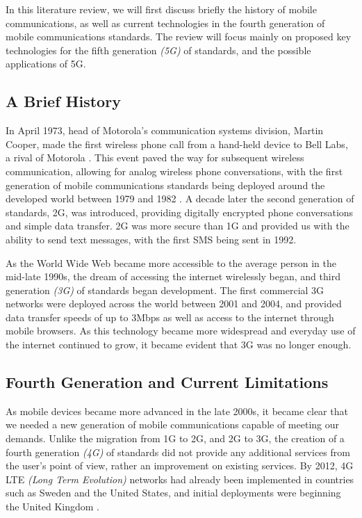 \documentclass[journal]{IEEEtran}
\begin{document}
In this literature review, we will first discuss briefly the history of mobile communications, as well as current technologies in the fourth generation of mobile communications standards. The review will focus mainly on proposed key technologies for the fifth generation \textit{(5G)} of standards, and the possible applications of 5G.

\subsection{A Brief History}
In April 1973, head of Motorola's communication systems division, Martin Cooper, made the first wireless phone call from a hand-held device to Bell Labs, a rival of Motorola \cite{tomfarhist}. This event paved the way for subsequent wireless communication, allowing for analog wireless phone conversations, with the first generation of mobile communications standards being deployed around the developed world between 1979 and 1982 \cite{evolution}. A decade later the second generation of standards, 2G, was introduced, providing digitally encrypted phone conversations and simple data transfer. 2G was more secure than 1G and provided us with the ability to send text messages, with the first SMS being sent in 1992. 

As the World Wide Web became more accessible to the average person in the mid-late 1990s, the dream of accessing the internet wirelessly began, and third generation \textit{(3G)} of standards began development. The first commercial 3G networks were deployed across the world between 2001 and 2004, and provided data transfer speeds of up to 3Mbps \cite{tomfarhist} as well as access to the internet through mobile browsers. As this technology became more widespread and everyday use of the internet continued to grow, it became evident that 3G was no longer enough.

\subsection{Fourth Generation and Current Limitations} \label{subsec:4g}
As mobile devices became more advanced in the late 2000s, it became clear that we needed a new generation of mobile communications capable of meeting our demands. Unlike the migration from 1G to 2G, and 2G to 3G, the creation of a fourth generation \textit{(4G)} of standards did not provide any additional services from the user's point of view, rather an improvement on existing services. By 2012, 4G LTE \textit{(Long Term Evolution)} networks had already been implemented in countries such as Sweden and the United States, and initial deployments were beginning the United Kingdom \cite{bbc4g}. 
\end{document}

